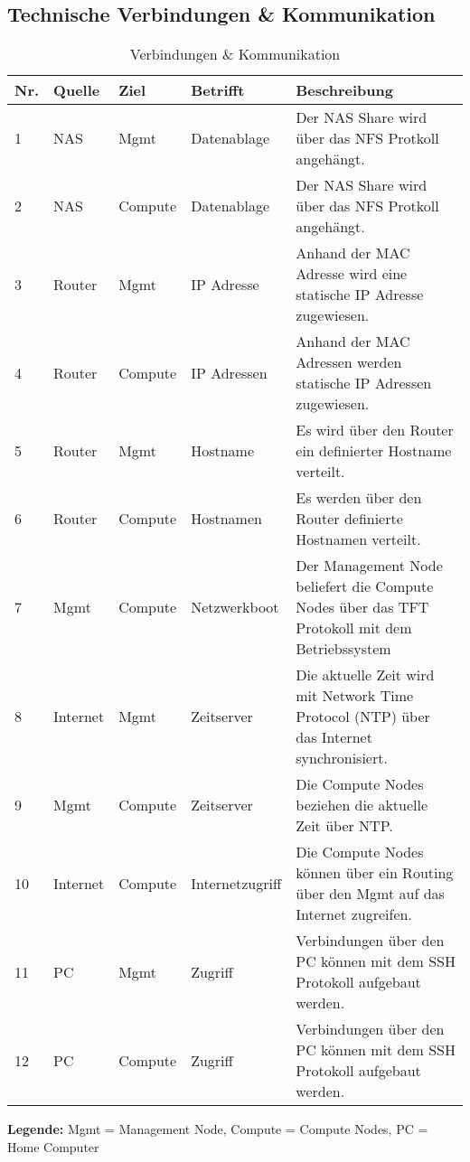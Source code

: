 \subsection{Technische Verbindungen \& Kommunikation}
\begin{table}[H]
\centering
\begin{tabular}{p{1cm}p{1.5cm}p{1.5cm}p{2.2cm}p{8.8cm}}
\hline
\rowcolor{heading} \textbf{Nr.} & \textbf{Quelle} & \textbf{Ziel }& \textbf{Betrifft} & \textbf{Beschreibung} \\\hline
1 & NAS & Mgmt & Datenablage & Der NAS Share wird über das NFS Protkoll angehängt. \\\hline
2 & NAS & Compute & Datenablage & Der NAS Share wird über das NFS Protkoll angehängt. \\\hline
3 & Router & Mgmt & IP Adresse & Anhand der MAC Adresse wird eine statische IP Adresse zugewiesen. \\\hline
4 & Router & Compute & IP Adressen & Anhand der MAC Adressen werden statische IP Adressen zugewiesen. \\\hline
5 & Router & Mgmt &Hostname & Es wird über den Router ein definierter Hostname verteilt. \\\hline
6 & Router & Compute & Hostnamen & Es werden über den Router definierte Hostnamen verteilt. \\\hline
7 & Mgmt & Compute & Netzwerkboot & Der Management Node beliefert die Compute Nodes über das TFT Protokoll mit dem Betriebssystem \\\hline
8 & Internet & Mgmt & Zeitserver & Die aktuelle Zeit wird mit Network Time Protocol (NTP) über das Internet synchronisiert.\\\hline
9 & Mgmt & Compute & Zeitserver & Die Compute Nodes beziehen die aktuelle Zeit über NTP.\\\hline
10 & Internet & Compute & Internetzugriff & Die Compute Nodes können über ein Routing über den Mgmt auf das Internet zugreifen. \\\hline
11 & PC & Mgmt & Zugriff & Verbindungen über den PC können mit dem SSH Protokoll aufgebaut werden. \\\hline
12 & PC & Compute & Zugriff & Verbindungen über den PC können mit dem SSH Protokoll aufgebaut werden. \\\hline
\end{tabular}
\caption{Verbindungen \& Kommunikation}
\end{table}
\textbf{Legende:} Mgmt = Management Node, Compute = Compute Nodes, PC = Home Computer
